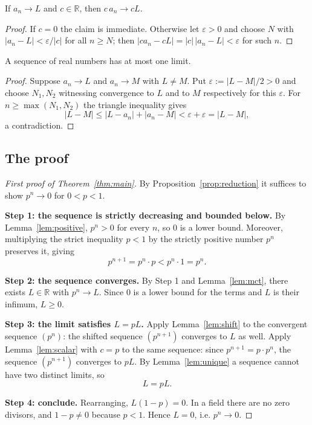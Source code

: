 \documentclass{essay}
\begin{document}
\begin{lemma}\label{lem:scalar}
  If \(a_{n} \to L\) and \(c \in \mathbb{R}\), then \(c\,a_{n} \to cL\).
\end{lemma}

\begin{proof}
  If \(c = 0\) the claim is immediate. Otherwise let \(\varepsilon > 0\) and choose \(N\)
  with \(|a_{n} - L| < \varepsilon / |c|\) for all \(n \geq N\); then
  \(|c a_{n} - cL| = |c|\,|a_{n} - L| < \varepsilon\) for such \(n\).
\end{proof}

\begin{lemma}\label{lem:unique}
  A sequence of real numbers has at most one limit.
\end{lemma}

\begin{proof}
  Suppose \(a_{n} \to L\) and \(a_{n} \to M\) with \(L \neq M\). Put
  \(\varepsilon := |L - M| / 2 > 0\) and choose \(N_{1}, N_{2}\) witnessing convergence to
  \(L\) and to \(M\) respectively for this \(\varepsilon\). For \(n \geq \max(N_{1}, N_{2})\)
  the triangle inequality gives
  \[ |L - M| \leq |L - a_{n}| + |a_{n} - M| < \varepsilon + \varepsilon = |L - M|, \]
  a contradiction.
\end{proof}

\subsection{The proof}

\begin{proof}[First proof of Theorem~\ref{thm:main}]
  By Proposition~\ref{prop:reduction} it suffices to show \(p^{n} \to 0\) for
  \(0 < p < 1\).

  \medskip
  \noindent\textbf{Step 1: the sequence is strictly decreasing and bounded below.}
  By Lemma~\ref{lem:positive}, \(p^{n} > 0\) for every \(n\), so \(0\) is a lower bound.
  Moreover, multiplying the strict inequality \(p < 1\) by the strictly positive number
  \(p^{n}\) preserves it, giving
  \[ p^{n+1} = p^{n} \cdot p < p^{n} \cdot 1 = p^{n}. \]

  \medskip
  \noindent\textbf{Step 2: the sequence converges.}
  By Step 1 and Lemma~\ref{lem:mct}, there exists \(L \in \mathbb{R}\) with
  \(p^{n} \to L\). Since \(0\) is a lower bound for the terms and \(L\) is their infimum,
  \(L \geq 0\).

  \medskip
  \noindent\textbf{Step 3: the limit satisfies \(L = pL\).}
  Apply Lemma~\ref{lem:shift} to the convergent sequence \((p^{n})\): the shifted
  sequence \((p^{n+1})\) converges to \(L\) as well. Apply Lemma~\ref{lem:scalar} with
  \(c = p\) to the same sequence: since \(p^{n+1} = p \cdot p^{n}\), the sequence
  \((p^{n+1})\) converges to \(pL\). By Lemma~\ref{lem:unique} a sequence cannot have two
  distinct limits, so
  \[ L = pL. \]

  \medskip
  \noindent\textbf{Step 4: conclude.}
  Rearranging, \(L(1 - p) = 0\). In a field there are no zero divisors, and
  \(1 - p \neq 0\) because \(p < 1\). Hence \(L = 0\), i.e. \(p^{n} \to 0\).
\end{proof}
\end{document}
